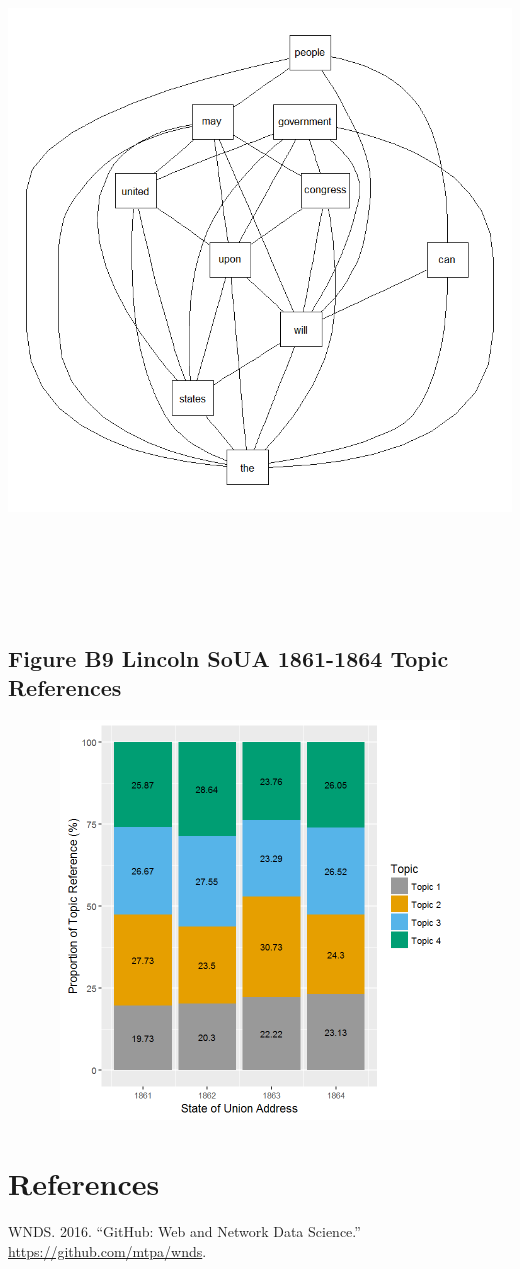 \documentclass[]{article}
\begin{document}
\includegraphics[height=7.29167in]{images/Lincolndata_corrcloud.png}

\subsection{Figure B9 Lincoln SoUA 1861-1864 Topic
References}\label{figure-b9-lincoln-soua-1861-1864-topic-references}

\includegraphics[width=8.33333in,height=4.16667in]{images/Lincolndata_topictrend.png}

\newpage

\section*{References}\label{references}

\hypertarget{refs}{}
\hypertarget{ref-github:wnds}{}
WNDS. 2016. ``GitHub: Web and Network Data Science.''
\url{https://github.com/mtpa/wnds}.
\end{document}
